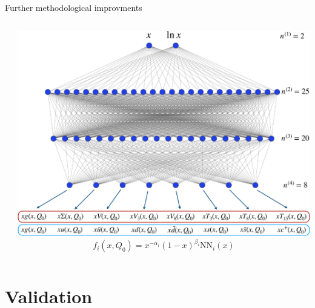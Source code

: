 \documentclass[aspectratio=169,9pt]{beamer}
\begin{document}
\begin{frame}[t]{Further methodological improvments}
\begin{columns}[T]
\begin{column}{0.48\textwidth}
\begin{itemize}
            \end{itemize}
        \end{column}
        \begin{column}{0.48\textwidth}
            \includegraphics[width=1.0\textwidth]{NNarch}
            \begin{equation*}
                f_{i}\left(x, Q_{0}\right)=x^{-\alpha_{i}}(1-x)^{\beta_{i}} \mathrm{NN}_{i}(x)
            \end{equation*}
        \end{column}
    \end{columns}
\end{frame}



\section{Validation}
\end{document}
